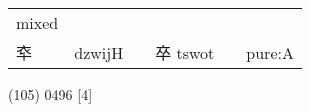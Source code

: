 \documentclass[14pt,a4paper]{scrartcl}
\begin{document}
\begin{longtable}[c]{@{}llllll@{}}
\begin{minipage}[t]{0.14\columnwidth}\raggedright\strut
mixed
\strut\end{minipage}\tabularnewline
\begin{minipage}[t]{0.14\columnwidth}\raggedright\strut
䘚
\strut\end{minipage} &
\begin{minipage}[t]{0.14\columnwidth}\raggedright\strut
dzwijH
\strut\end{minipage} &
\begin{minipage}[t]{0.14\columnwidth}\raggedright\strut
\strut\end{minipage} &
\begin{minipage}[t]{0.14\columnwidth}\raggedright\strut
卒 tswot
\strut\end{minipage} &
\begin{minipage}[t]{0.14\columnwidth}\raggedright\strut
\strut\end{minipage} &
\begin{minipage}[t]{0.14\columnwidth}\raggedright\strut
pure:A
\strut\end{minipage}\tabularnewline
\bottomrule
\end{longtable}

(105) 0496 {[}4{]}
\end{document}
